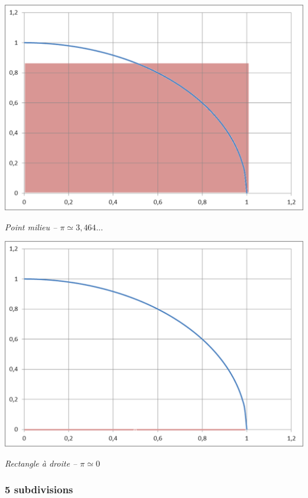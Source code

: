 \documentclass[11pt]{article}
\begin{document}
\begin{minipage}[c]{.24\linewidth}
\begin{center}
\includegraphics[width=.99\textwidth]{images/pi_1_m}

\textit{Point milieu -- $\pi \simeq 3,464...$}
\end{center}
\end{minipage}\hfill
\begin{minipage}[c]{.24\linewidth}
\begin{center}
\includegraphics[width=.99\textwidth]{images/pi_1_d}

\textit{Rectangle à droite -- $\pi \simeq 0$}
\end{center}
\end{minipage}


\subsubsection*{5 subdivisions}
\end{document}
